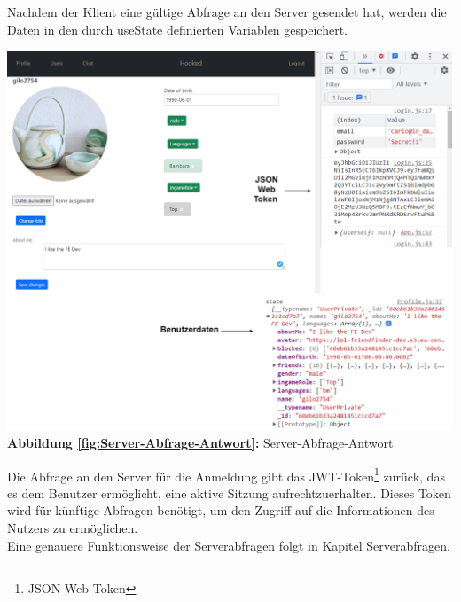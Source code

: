 Nachdem der Klient eine gültige Abfrage an den Server gesendet hat, werden die Daten in den durch useState definierten Variablen gespeichert.
\begin{center}
  \includegraphics[scale=0.4]
  {sources/Server-Abfrage-Antwort}\label{fig:Server-Abfrage-Antwort}\\
  \textbf{Abbildung \autoref{fig:Server-Abfrage-Antwort}:} Server-Abfrage-Antwort
\end{center}

Die Abfrage an den Server für die Anmeldung gibt das JWT-Token\footnote{JSON Web Token{\cite{JWT1}}} zurück, das es dem Benutzer ermöglicht, eine aktive Sitzung aufrechtzuerhalten. Dieses Token wird für künftige Abfragen benötigt, um den Zugriff auf die Informationen des Nutzers zu ermöglichen.
\\
Eine genauere Funktionsweise der Serverabfragen folgt in Kapitel Serverabfragen.
\\

\newpage

